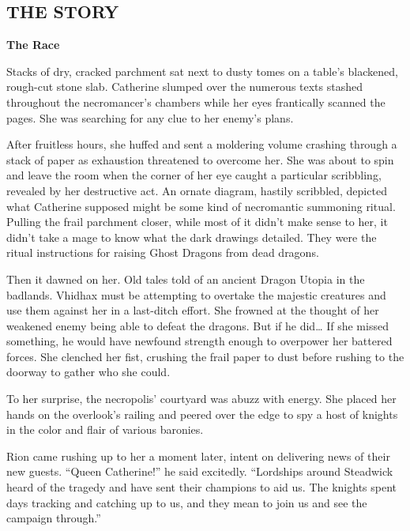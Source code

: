 \newpage

\begin{multicols*}{2}

\subsection*{\MakeUppercase{The story}}

\textbf{The Race}

Stacks of dry, cracked parchment sat next to dusty tomes on a table's blackened, rough-cut stone slab.
Catherine slumped over the numerous texts stashed throughout the necromancer's chambers while her eyes frantically scanned the pages.
She was searching for any clue to her enemy's plans.

After fruitless hours, she huffed and sent a moldering volume crashing through a stack of paper as exhaustion threatened to overcome her.
She was about to spin and leave the room when the corner of her eye caught a particular scribbling, revealed by her destructive act.
An ornate diagram, hastily scribbled, depicted what Catherine supposed might be some kind of necromantic summoning ritual.
Pulling the frail parchment closer, while most of it didn't make sense to her, it didn't take a mage to know what the dark drawings detailed.
They were the ritual instructions for raising Ghost Dragons from dead dragons.

Then it dawned on her.
Old tales told of an ancient Dragon Utopia in the badlands.
Vhidhax must be attempting to overtake the majestic creatures and use them against her in a last-ditch effort.
She frowned at the thought of her weakened enemy being able to defeat the dragons.
But if he did… If she missed something, he would have newfound strength enough to overpower her battered forces.
She clenched her fist, crushing the frail paper to dust before rushing to the doorway to gather who she could.

To her surprise, the necropolis' courtyard was abuzz with energy.
She placed her hands on the overlook's railing and peered over the edge to spy a host of knights in the color and flair of various baronies. 

Rion came rushing up to her a moment later, intent on delivering news of their new guests.
``Queen Catherine!'' he said excitedly.
``Lordships around Steadwick heard of the tragedy and have sent their champions to aid us.
The knights spent days tracking and catching up to us, and they mean to join us and see the campaign through.''


\end{multicols*}
